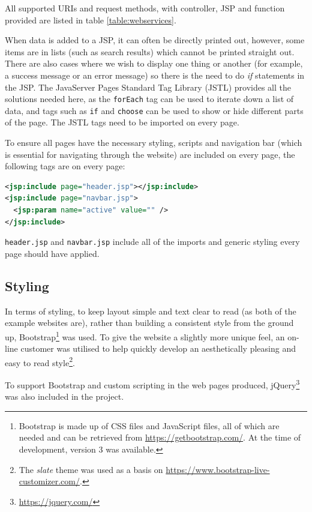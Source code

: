 All supported URIs and request methods, with controller, JSP and function provided are listed in table \ref{table:webservices}. 

When data is added to a JSP, it can often be directly printed out, however, some items are in lists (such as search results) which cannot be printed straight out. There are also cases where we wish to display one thing or another (for example, a success message or an error message) so there is the need to do \textit{if} statements in the JSP. The JavaServer Pages Standard Tag Library (JSTL) provides all the solutions needed here, as the \texttt{forEach} tag can be used to iterate down a list of data, and tags such as \texttt{if} and \texttt{choose} can be used to show or hide different parts of the page. The JSTL tags need to be imported on every page.

To ensure all pages have the necessary styling, scripts and navigation bar (which is essential for navigating through the website) are included on every page, the following tags are on every page:

\begin{lstlisting}[language=XML]
<jsp:include page="header.jsp"></jsp:include>
<jsp:include page="navbar.jsp">
  <jsp:param name="active" value="" />
</jsp:include>
\end{lstlisting}

\texttt{header.jsp} and \texttt{navbar.jsp} include all of the imports and generic styling every page should have applied.

\subsection*{Styling}
In terms of styling, to keep layout simple and text clear to read (as both of the example websites are), rather than building a consistent style from the ground up, Bootstrap\footnote{Bootstrap is made up of CSS files and JavaScript files, all of which are needed and can be retrieved from \href{https://getbootstrap.com/}{https://getbootstrap.com/}. At the time of development, version 3 was available.} was used. To give the website a slightly more unique feel, an on-line customer was utilised to help quickly develop an aesthetically pleasing and easy to read style\footnote{The \textit{slate} theme was used as a basis on \href{https://www.bootstrap-live-customizer.com/}{https://www.bootstrap-live-customizer.com/}.}.

To support Bootstrap and custom scripting in the web pages produced, jQuery\footnote{\href{https://jquery.com/}{https://jquery.com/}} was also included in the project.

